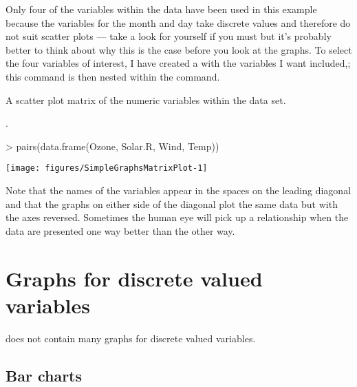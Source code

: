 Only four of the variables within the  data have been used in this example because the variables for the month and day take discrete values and therefore do not suit scatter plots --- take a look for yourself if you must but it's probably better to think about why this is the case before you look at the graphs. To select the four variables of interest, I have created a  with the variables I want included,; this  command is then nested within the  command.
\begin{exhibit}
\begin{center}
\caption{A scatter plot matrix of the numeric variables within the  data set.}
\label{AirQualityScatterPlotMatrix}.
\begin{Schunk}
\begin{Sinput}
> pairs(data.frame(Ozone, Solar.R, Wind, Temp))
\end{Sinput}

\texttt{[image: figures/SimpleGraphsMatrixPlot-1]} \end{Schunk}
\end{center}
\end{exhibit}

Note that the names of the variables appear in the spaces on the leading diagonal and that the graphs on either side of the diagonal plot the same data but with the axes reversed. Sometimes the human eye will pick up a relationship when the data are presented one way better than the other way.

\section{Graphs for discrete valued variables}

\R{} does not contain many graphs for discrete valued variables.

\subsection{Bar charts}
\label{BarCharts}

